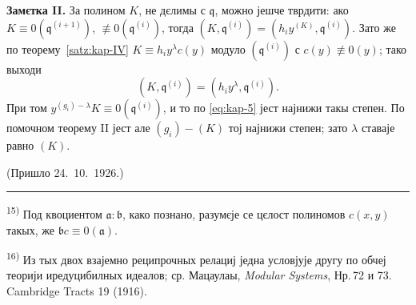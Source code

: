 \documentclass[11pt]{article}
\newcommand{\foreign}[1]{#1}
\theoremstyle{plain}
\begin{document}
\textbf{Замєтка II.} За полином $K$, не дєлимы с $\mathfrak{q}$,
можно јешче тврдити: ако
$K \equiv 0(\mathfrak{q}^{(i+1)})$,
$\not\equiv 0(\mathfrak{q}^{(i)})$, тогда
$(K, \mathfrak{q}^{(i)}) = (h_{i}y^{(K)}, \mathfrak{q}^{(i)})$.
Зато же по теорему~\ref{satz:kap-IV}
$K \equiv h_{i}y^{\lambda}c(y)$ модуло
$(\mathfrak{q}^{(i)})$ с $c(y) \not\equiv 0(y)$; тако выходи
\[
(K, \mathfrak{q}^{(i)}) = (h_{i}y^{\lambda}, \mathfrak{q}^{(i)}).
\]
При том $y^{(g_i)-\lambda}K\equiv0(\mathfrak{q}^{(i)})$,
и то по \eqref{eq:kap-5} јест најнижи такы степен. По помочном
теорему II јест але $(g_{i}) - (K)$ тој најнижи степен; зато
$\lambda$ ставаје равно $(K)$.

\vfill
\begin{flushright}
(Пришло 24.\ 10.\ 1926.)
\end{flushright}

\vspace{0.5em}
\noindent\rule{\textwidth}{0.4pt}
\vspace{0.3em}

{\footnotesize
\textsuperscript{15)} Под квоциентом $\mathfrak{a}:\mathfrak{b}$, како познано,
разумєје се цєлост полиномов $c(x,y)$ такых, же
$\mathfrak{b}c \equiv 0(\mathfrak{a})$.

\textsuperscript{16)} Из тых двох взајемно реципрочных релациј једна условјује
другу по обчеј теорији иредуцибилных идеалов; ср. Мацаулаы,
\textit{\foreign{Modular Systems}}, Нр.\,72 и 73. \foreign{Cambridge Tracts} 19 (1916).
}
\end{document}
